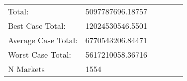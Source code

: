 \begin{tabular}[t]{llllll}
\midrule
\hspace{1em}Total: & 5097787696.18757 &  &  &  & \\
\hspace{1em}Best Case Total: & 12024530546.5501 &  &  &  & \\
\hspace{1em}Average Case Total: & 6770543206.84471 &  &  &  & \\
\hspace{1em}Worst Case Total: & 5617210058.36716 &  &  &  & \\
\hspace{1em}N Markets & 1554 &  &  &  & \\
\bottomrule
\end{tabular}
